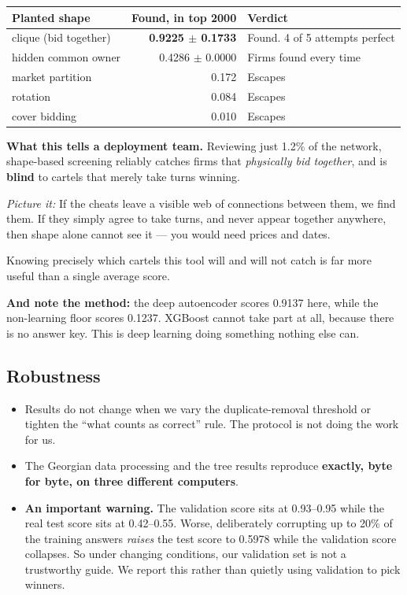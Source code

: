 \documentclass[11pt,a4paper]{article}
\newcommand{\pw}[1]{\textit{\textcolor{accent}{Picture it:}} #1}
\begin{document}
\begin{center}\small
\begin{tabular}{@{}lrl@{}}
\toprule
\textbf{Planted shape} & \textbf{Found, in top 2000} & \textbf{Verdict} \\
\midrule
clique (bid together) & \textbf{0.9225 $\pm$ 0.1733} & Found. 4 of 5 attempts perfect \\
hidden common owner & 0.4286 $\pm$ 0.0000 & Firms found every time \\
market partition & 0.172 & Escapes \\
rotation & 0.084 & Escapes \\
cover bidding & 0.010 & Escapes \\
\bottomrule
\end{tabular}
\end{center}

\begin{keybox}
\textbf{What this tells a deployment team.} Reviewing just 1.2\% of the network,
shape-based screening reliably catches firms that \emph{physically bid together},
and is \textbf{blind} to cartels that merely take turns winning.

\pw{If the cheats leave a visible web of connections between them, we find them.
If they simply agree to take turns, and never appear together anywhere, then
shape alone cannot see it --- you would need prices and dates.}

Knowing precisely which cartels this tool will and will not catch is far more
useful than a single average score.

\textbf{And note the method:} the deep autoencoder scores 0.9137 here, while the
non-learning floor scores 0.1237. XGBoost cannot take part at all, because there
is no answer key. This is deep learning doing something nothing else can.
\end{keybox}

\subsection{Robustness}

\begin{itemize}
  \item Results do not change when we vary the duplicate-removal threshold or
        tighten the ``what counts as correct'' rule. The protocol is not doing the
        work for us.
  \item The Georgian data processing and the tree results reproduce
        \textbf{exactly, byte for byte, on three different computers}.
  \item \textbf{An important warning.} The validation score sits at 0.93--0.95
        while the real test score sits at 0.42--0.55. Worse, deliberately
        corrupting up to 20\% of the training answers \emph{raises} the test score
        to 0.5978 while the validation score collapses. So under changing
        conditions, our validation set is not a trustworthy guide. We report this
        rather than quietly using validation to pick winners.
\end{itemize}
\end{document}
